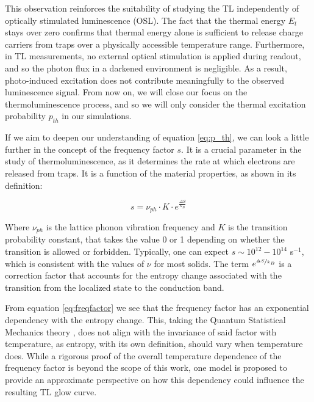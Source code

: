 \vspace{10pt}

This observation reinforces the suitability of studying the TL independently of optically stimulated luminescence (OSL). The fact that the thermal energy $E_t$ stays over zero confirms that thermal energy alone is sufficient to release charge carriers from traps over a physically accessible temperature range. Furthermore, in TL measurements, no external optical stimulation is applied during readout, and so the photon flux in a darkened environment is negligible. As a result, photo-induced excitation does not contribute meaningfully to the observed luminescence signal. From now on, we will close our focus on the thermoluminescence process, and so we will only consider the thermal excitation probability $p_{th}$ in our simulations.

\vspace{10pt}

If we aim to deepen our understanding of equation \ref{eq:p_th}, we can look a little further in the concept of the frequency factor $s$. It is a crucial parameter in the study of thermoluminescence, as it determines the rate at which electrons are released from traps. It is a function of the material properties, as shown in its definition:

\begin{equation} \label{eq:freqfactor}
  s = \nu_{ph} \cdot K \cdot e^{\frac{\Delta S}{k_B}}
\end{equation}

\vspace{10pt}
Where $\nu_{ph}$ is the lattice phonon vibration frequency and $K$ is the transition probability constant, that takes the value 0 or 1 depending on whether the transition is allowed or forbidden. Typically, one can expect $s \sim 10^{12} -10^{14}$ s$^{-1}$, which is consistent with the values of $\nu$ for most solids. The term $e^{\nicefrac{\Delta S}{k_B}}$ is a correction factor that accounts for the entropy change associated with the transition from the localized state to the conduction band. 

\vspace{10pt}

From equation \ref{eq:freqfactor} we see that the frequency factor has an exponential dependency with the entropy change. This, taking the Quantum Statistical Mechanics theory \cite{brey}, does not align with the invariance of said factor with temperature, as entropy, with its own definition, should vary when temperature does. While a rigorous proof of the overall temperature dependence of the frequency factor is beyond the scope of this work, one model is proposed to provide an approximate perspective on how this dependency could influence the resulting TL glow curve. 

